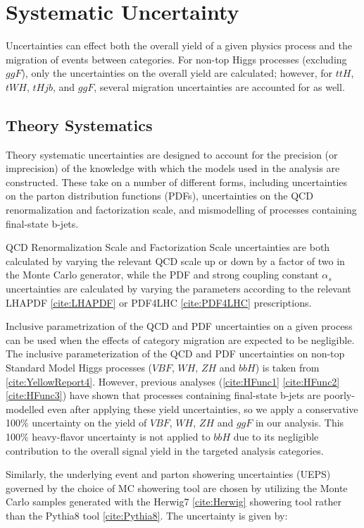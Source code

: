 \section{Systematic Uncertainty}

Uncertainties can effect both the overall yield of a given physics process and the migration of events between categories. For non-top Higgs processes (excluding $ggF$), only the uncertainties on the overall yield are calculated; however, for $ttH$, $tWH$, $tHjb$, and $ggF$, several migration uncertainties are accounted for as well.

\subsection{Theory Systematics}

Theory systematic uncertainties are designed to account for the precision (or imprecision) of the knowledge with which the models used in the analysis are constructed. These take on a number of different forms, including uncertainties on the parton distribution functions (PDFs), uncertainties on the QCD renormalization and factorization scale, and mismodelling of processes containing final-state b-jets.

QCD Renormalization Scale and Factorization Scale uncertainties are both calculated by varying the relevant QCD scale up or down by a factor of two in the Monte Carlo generator, while the PDF and strong coupling constant $\alpha_{s}$ uncertainties are calculated by varying the parameters according to the relevant LHAPDF \ref{cite:LHAPDF} or PDF4LHC \ref{cite:PDF4LHC} prescriptions.

Inclusive parametrization of the QCD and PDF uncertainties on a given process can be used when the effects of category migration are expected to be negligible. The inclusive parameterization of the QCD and PDF uncertainties on non-top Standard Model Higgs processes ($VBF$, $WH$, $ZH$ and $bbH$) is taken from \ref{cite:YellowReport4}. However, previous analyses (\ref{cite:HFunc1} \ref{cite:HFunc2} \ref{cite:HFunc3}) have shown that  processes containing final-state b-jets are poorly-modelled even after applying these yield uncertainties, so we apply a conservative 100\% uncertainty on the yield of $VBF$, $WH$, $ZH$ and $ggF$ in our analysis. This 100\% heavy-flavor uncertainty is not applied to $bbH$ due to its negligible contribution to the overall signal yield in the targeted analysis categories.

Similarly, the underlying event and parton showering uncertainties (UEPS) governed by the choice of MC showering tool are chosen by utilizing the Monte Carlo samples generated with the Herwig7 \ref{cite:Herwig} showering tool rather than the Pythia8 tool \ref{cite:Pythia8}. The uncertainty is given by:


